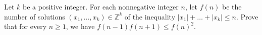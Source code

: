 Let \(k\) be a positive integer. For each nonnegative integer \(n\), let \(f(n)\) be the number of solutions \((x_1,\ldots,x_k)\in\mathbb{Z}^k\) of the inequality \(|x_1|+\dots+|x_k|\leq n\). Prove that for every \(n\ge1\), we have \(f(n-1)f(n+1)\leq f(n)^2\).